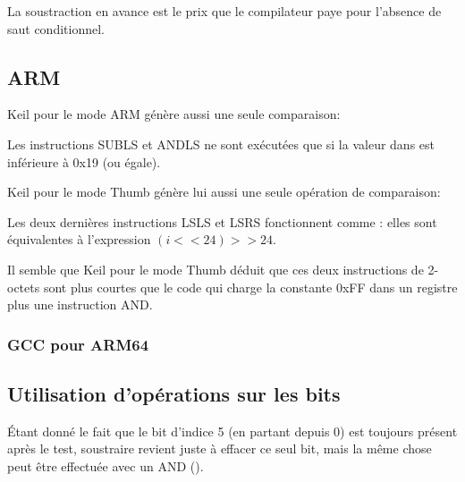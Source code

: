 La soustraction en avance est le prix que le compilateur paye pour l'absence de saut
conditionnel.

\subsection{ARM}

Keil \Optimizing pour le mode ARM génère aussi une seule comparaison:



Les instructions SUBLS et ANDLS ne sont exécutées que si la valeur dans  est
inférieure à 0x19 (ou égale).

Keil \Optimizing pour le mode Thumb génère lui aussi une seule opération de comparaison:



Les deux dernières instructions LSLS et LSRS fonctionnent comme :
elles sont équivalentes à l'expression \CCpp $(i<<24)>>24$.

Il semble que Keil pour le mode Thumb déduit que ces deux instructions de 2-octets
sont plus courtes que le code qui charge la constante 0xFF dans un registre plus
une instruction AND.

\subsubsection{GCC pour ARM64}





\subsection{Utilisation d'opérations sur les bits}
\label{toupper_bit}

Étant donné le fait que le bit d'indice 5 (en partant depuis 0) est toujours présent
après le test, soustraire revient juste à effacer ce seul bit, mais la même chose
peut être effectuée avec un AND ().

